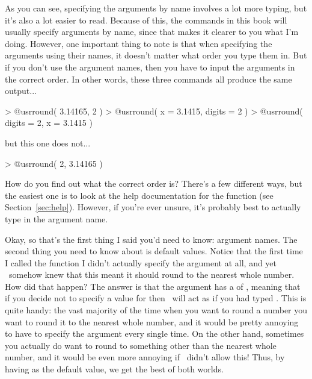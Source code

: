 As you can see, specifying the arguments by name involves a lot more typing, but it's also a lot easier to read. Because of this, the commands in this book will usually specify arguments by name, since that makes it clearer to you what I'm doing. However, one important thing to note is that when specifying the arguments using their names, it doesn't matter what order you type them in. But if you don't use the argument names, then you have to input the arguments in the correct order. In other words, these three commands all produce the same output...
\begin{rblock1}
> @usr{round( 3.14165, 2 )}
> @usr{round( x = 3.1415, digits = 2 )}
> @usr{round( digits = 2, x = 3.1415 )}
\end{rblock1}
but this one does not...
\begin{rblock1}
> @usr{round( 2, 3.14165 )}
\end{rblock1}
How do you find out what the correct order is? There's a few different ways, but the easiest one is to look at the help documentation for the function (see Section~\ref{sec:help}). However, if you're ever unsure, it's probably best to actually type in the argument name.


Okay, so that's the first thing I said you'd need to know: argument names. The second thing you need to know about is default values. Notice that the first time I called the  function I didn't actually specify the  argument at all, and yet \R\ somehow knew that this meant it should round to the nearest whole number. How did that happen? The answer is that the  argument has a  of , meaning that if you decide not to specify a value for  then \R\ will act as if you had typed . This is quite handy: the vast majority of the time when you want to round a number you want to round it to the nearest whole number, and it would be pretty annoying to have to specify the  argument every single time. On the other hand, sometimes you actually do want to round to something other than the nearest whole number, and it would be even more annoying if \R\ didn't allow this! Thus, by having  as the default value, we get the best of both worlds.



